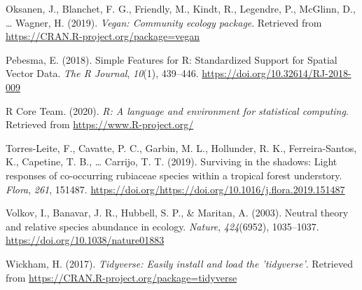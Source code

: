 \documentclass[11pt,]{article}
\begin{document}
\hypertarget{ref-cita_vegan}{}
Oksanen, J., Blanchet, F. G., Friendly, M., Kindt, R., Legendre, P.,
McGlinn, D., \ldots{} Wagner, H. (2019). \emph{Vegan: Community ecology
package}. Retrieved from \url{https://CRAN.R-project.org/package=vegan}

\hypertarget{ref-cita_sf}{}
Pebesma, E. (2018). Simple Features for R: Standardized Support for
Spatial Vector Data. \emph{The R Journal}, \emph{10}(1), 439--446.
\url{https://doi.org/10.32614/RJ-2018-009}

\hypertarget{ref-cita_r}{}
R Core Team. (2020). \emph{R: A language and environment for statistical
computing}. Retrieved from \url{https://www.R-project.org/}

\hypertarget{ref-TORRESLEITE2019151487}{}
Torres-Leite, F., Cavatte, P. C., Garbin, M. L., Hollunder, R. K.,
Ferreira-Santos, K., Capetine, T. B., \ldots{} Carrijo, T. T. (2019).
Surviving in the shadows: Light responses of co-occurring rubiaceae
species within a tropical forest understory. \emph{Flora}, \emph{261},
151487.
\url{https://doi.org/https://doi.org/10.1016/j.flora.2019.151487}

\hypertarget{ref-Volkov_2003}{}
Volkov, I., Banavar, J. R., Hubbell, S. P., \& Maritan, A. (2003).
Neutral theory and relative species abundance in ecology. \emph{Nature},
\emph{424}(6952), 1035--1037. \url{https://doi.org/10.1038/nature01883}

\hypertarget{ref-cita_tidyverse}{}
Wickham, H. (2017). \emph{Tidyverse: Easily install and load the
'tidyverse'}. Retrieved from
\url{https://CRAN.R-project.org/package=tidyverse}




\newpage
\singlespacing 
\end{document}
